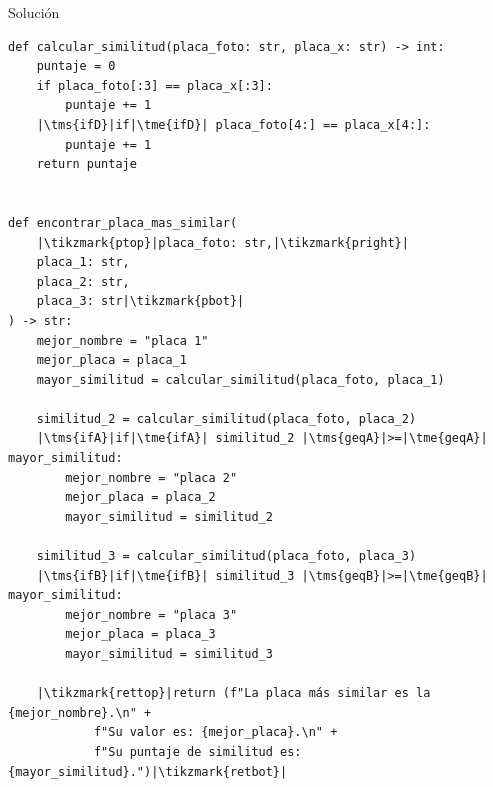 \documentclass{ip-quiz}
\begin{document}
\begin{sectionbox}{Solución}
\begin{verbatim}
def calcular_similitud(placa_foto: str, placa_x: str) -> int:
    puntaje = 0
    if placa_foto[:3] == placa_x[:3]:
        puntaje += 1
    |\tms{ifD}|if|\tme{ifD}| placa_foto[4:] == placa_x[4:]:
        puntaje += 1
    return puntaje


def encontrar_placa_mas_similar(
    |\tikzmark{ptop}|placa_foto: str,|\tikzmark{pright}|
    placa_1: str,
    placa_2: str,
    placa_3: str|\tikzmark{pbot}|
) -> str:
    mejor_nombre = "placa 1"
    mejor_placa = placa_1
    mayor_similitud = calcular_similitud(placa_foto, placa_1)

    similitud_2 = calcular_similitud(placa_foto, placa_2)
    |\tms{ifA}|if|\tme{ifA}| similitud_2 |\tms{geqA}|>=|\tme{geqA}| mayor_similitud:
        mejor_nombre = "placa 2"
        mejor_placa = placa_2
        mayor_similitud = similitud_2

    similitud_3 = calcular_similitud(placa_foto, placa_3)
    |\tms{ifB}|if|\tme{ifB}| similitud_3 |\tms{geqB}|>=|\tme{geqB}| mayor_similitud:
        mejor_nombre = "placa 3"
        mejor_placa = placa_3
        mayor_similitud = similitud_3

    |\tikzmark{rettop}|return (f"La placa más similar es la {mejor_nombre}.\n" +
            f"Su valor es: {mejor_placa}.\n" +
            f"Su puntaje de similitud es: {mayor_similitud}.")|\tikzmark{retbot}|
\end{verbatim}

\end{sectionbox}
\end{document}
